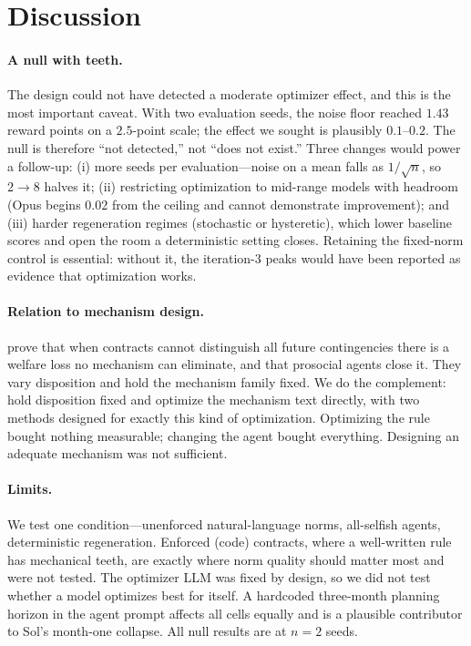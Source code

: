 \documentclass[11pt]{article}
\begin{document}
\section{Discussion}

\paragraph{A null with teeth.}
The design could not have detected a moderate optimizer effect, and this is the
most important caveat. With two evaluation seeds, the noise floor reached $1.43$
reward points on a $2.5$-point scale; the effect we sought is plausibly $0.1$--$0.2$.
The null is therefore ``not detected,'' not ``does not exist.'' Three changes
would power a follow-up: (i) more seeds per evaluation---noise on a mean falls as
$1/\sqrt{n}$, so $2\rightarrow8$ halves it; (ii) restricting optimization to
mid-range models with headroom (Opus begins $0.02$ from the ceiling and cannot
demonstrate improvement); and (iii) harder regeneration regimes (stochastic or
hysteretic), which lower baseline scores and open the room a deterministic
setting closes. Retaining the fixed-norm control is essential: without it, the
iteration-$3$ peaks would have been reported as evidence that optimization works.

\paragraph{Relation to mechanism design.}
\citet{mechdesign} prove that when contracts cannot distinguish all future
contingencies there is a welfare loss no mechanism can eliminate, and that
prosocial agents close it. They vary disposition and hold the mechanism family
fixed. We do the complement: hold disposition fixed and optimize the mechanism
text directly, with two methods designed for exactly this kind of optimization.
Optimizing the rule bought nothing measurable; changing the agent bought
everything. Designing an adequate mechanism was not sufficient.

\paragraph{Limits.}
We test one condition---unenforced natural-language norms, all-selfish agents,
deterministic regeneration. Enforced (code) contracts, where a well-written rule
has mechanical teeth, are exactly where norm quality should matter most and were
not tested. The optimizer LLM was fixed by design, so we did not test whether a
model optimizes best for itself. A hardcoded three-month planning horizon in the
agent prompt affects all cells equally and is a plausible contributor to Sol's
month-one collapse. All null results are at $n=2$ seeds.
\end{document}
